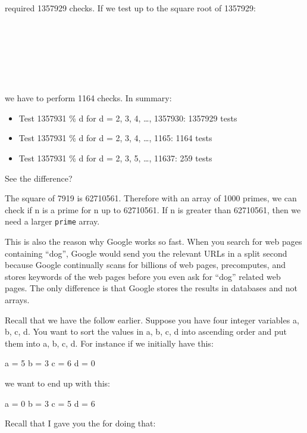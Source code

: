 required 1357929 checks. If we test up to the square root of 1357929:

\\
\\
\\
\\
\\
\\

we have to perform 1164 checks. In summary:

\begin{itemize}
\item
  Test 1357931 \% d for d = 2, 3, 4, \ldots, 1357930: 1357929 tests
\item
  Test 1357931 \% d for d = 2, 3, 4, \ldots, 1165: 1164 tests
\item
  Test 1357931 \% d for d = 2, 3, 5, \ldots, 11637: 259 tests
\end{itemize}

See the difference?

The square of 7919 is 62710561. Therefore with an array of 1000 primes, we can check if n is a prime for n up to 62710561. If n is greater than 62710561, then we need a larger \texttt{prime} array.

This is also the reason why Google works so fast. When you search for web pages containing ``dog'', Google would send you the relevant URLs in a split second because Google continually scans for billions of web pages, precomputes, and stores keywords of the web pages before you even ask for ``dog'' related web pages. The only difference is that Google stores the results in databases and not arrays.

\newpage{}

Recall that we have the follow earlier. Suppose you have four integer variables a, b, c, d. You want to sort the values in a, b, c, d into ascending order and put them into a, b, c, d. For instance if we initially have this:
\begin{center}
a = 5 b = 3 c = 6 d = 0
\end{center}
we want to end up with this:
\begin{center}
a = 0 b = 3 c = 5 d = 6
\end{center}
Recall that I gave you the  for doing that:

